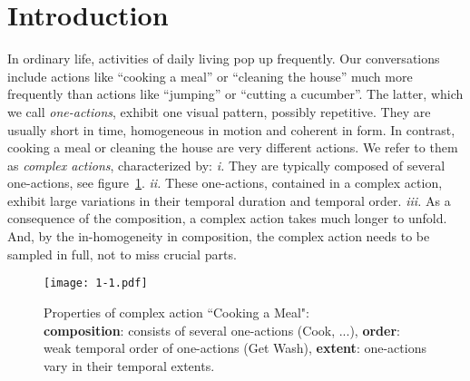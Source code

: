 \documentclass[10pt,twocolumn,letterpaper]{article}
\begin{document}
\section{Introduction}
In ordinary life, activities of daily living pop up frequently.
Our conversations include actions like ``cooking a meal'' or ``cleaning the house'' much more frequently than actions like ``jumping'' or ``cutting a cucumber''.
The latter, which we call \emph{one-actions}, exhibit one visual pattern, possibly repetitive.
They are usually short in time, homogeneous in motion and coherent in form.
In contrast, cooking a meal or cleaning the house are very different actions.
We refer to them as \emph{complex actions}, characterized by:
\emph{i.} They are typically composed of several one-actions, see  figure~\ref{fig:1-1}.
\emph{ii.}
These one-actions, contained in a complex action, exhibit large variations in their temporal duration and temporal order.
\emph{iii.} As a consequence of the composition, a complex action takes much longer to unfold.
And, by the in-homogeneity in composition, the complex action needs to be sampled in full, not to miss crucial parts.
\begin{figure}[!ht]
\begin{center}
\texttt{[image: 1-1.pdf]}
\end{center}
\caption{Properties of complex action ``Cooking a Meal":\\
\textbf{composition}: consists of several one-actions (Cook, ...),
\protect\linebreak
\textbf{order}: weak temporal order of one-actions (Get {\large } Wash),
\protect\linebreak
\textbf{extent}: one-actions vary in their temporal extents.}
\label{fig:1-1}
\vspace*{-5mm}
\end{figure}
\end{document}
